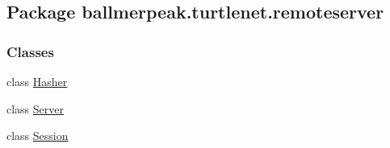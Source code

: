 \hypertarget{namespaceballmerpeak_1_1turtlenet_1_1remoteserver}{\subsection{Package ballmerpeak.\-turtlenet.\-remoteserver}
\label{namespaceballmerpeak_1_1turtlenet_1_1remoteserver}
}
\subsubsection*{Classes}
\begin{DoxyCompactItemize}
\item 
class \hyperlink{classballmerpeak_1_1turtlenet_1_1remoteserver_1_1Hasher}{Hasher}
\item 
class \hyperlink{classballmerpeak_1_1turtlenet_1_1remoteserver_1_1Server}{Server}
\item 
class \hyperlink{classballmerpeak_1_1turtlenet_1_1remoteserver_1_1Session}{Session}
\end{DoxyCompactItemize}
